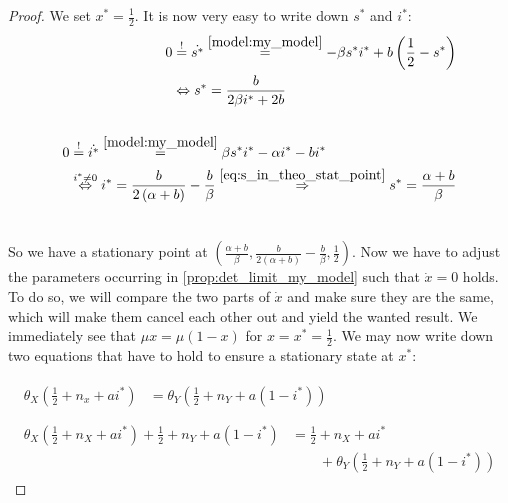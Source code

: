 \documentclass[12pt,a4paper,twoside]{article}
\begin{document}
\begin{proof}
	We set $x^* = \frac{1}{2}$. It is now very easy to write down $s^*$ and $i^*$:
	\begin{align}
	\begin{split}\label{eq:s_in_theo_stat_point}
		0 &\overset{!}{=} \dot{s^*} \overset{\eqref{model:my_model}}{=}-\beta s^*i^* + b \left(\frac{1}{2} - s^*\right)\\
		&\Leftrightarrow s^* = \frac{b}{2\beta i^*+ 2b}\\
		&\end{split}\\
		\begin{split}\label{eq:i_in_theo_stat_point}
		0 &\overset{!}{=} \dot{i^*} \overset{\eqref{model:my_model}}{=}\beta s^*i^* -\alpha i^* - bi^*\\
		&\overset{i^* \neq 0}{\Leftrightarrow} i^* = \frac{b}{2\left(\alpha + b\right)} - \frac{b}{\beta} \overset{\eqref{eq:s_in_theo_stat_point}}{\Rightarrow} s^* = \frac{\alpha + b}{\beta}\\
		&\end{split}
	\end{align}
	
	So we have a stationary point at $\left(\frac{\alpha + b}{\beta}, \frac{b}{2\left(\alpha + b\right)} - \frac{b}{\beta}, \frac{1}{2}\right)$. Now we have to adjust the parameters occurring in \eqref{prop:det_limit_my_model} such that $\dot{x} = 0$ holds. To do so, we will compare the two parts of $\dot{x}$ and make sure they are the same, which will make them cancel each other out and yield the wanted result. We immediately see that $\mu x = \mu\left(1-x\right)$ for $x = x^* = \frac{1}{2}$. We may now write down two equations that have to hold to ensure a stationary state at $x^*$:
	
	\begin{align}
		\begin{split}\label{eq:numerator_equality}
		\theta_X\left(\frac{1}{2}+n_x+ai^*\right) &= \theta_Y\left(\frac{1}{2}+n_Y+a(1-i^*)\right)\\
		&\end{split}\\
		\begin{split}\label{eq:denominator_equality}
		\theta_X\left(\frac{1}{2}+n_X+ai^*\right) + \frac{1}{2}+n_Y+a(1-i^*) &= \frac{1}{2}+n_X+ai^*\\
		&\qquad +\theta_Y\left(\frac{1}{2}+n_Y+a(1-i^*)\right)\end{split}
	\end{align}
	

\end{proof}
\end{document}
